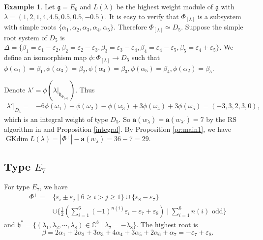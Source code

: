 \documentclass[reqno,12pt]{amsart}
\numberwithin{equation}{section}
\theoremstyle{plain}
\theoremstyle{definition}
\newtheorem{ex}[Thm]{Example}
\newcommand{\lam}{\lambda}
\newcommand{\ep}{\varepsilon}
\newcommand{\Ann}{\mathrm{Ann}}
\newcommand{\hs}{ \mathfrak{h}^*}
\newcommand{\aff}{ \mathbf{a} }
\newcommand{\gkd}{\operatorname{GKdim}}
\renewcommand{\leq}{\leqslant}
\renewcommand{\geq}{\geqslant}
\begin{document}
\begin{ex}
	Let $\mathfrak{g}=E_6$ and $L(\lam)$ be the highest weight module of $\mathfrak{g}$ with  $\lambda=(1,2,1,4,4.5,0.5, 0.5, -0.5)$. It is easy to verify that $\Phi_{[\lambda]}$ is a subsystem with simple roots $\{ \alpha_1,\alpha_2,\alpha_3,  \alpha_4, \alpha_5\}$. Therefore $\Phi_{[\lambda]}\simeq D_5$. Suppose the simple root system of $D_5$ is $\Delta=\{\beta_1=\ep_1-\ep_2, \beta_2=\ep_2-\ep_3, \beta_3=\ep_3-\ep_4,\beta_4=\ep_4-\ep_5,\beta_5=\ep_4+\ep_5\}$. We define an isomorphism map $\phi: \Phi_{[\lambda]} \rightarrow D_5$  such that  $\phi(\alpha_1)=\beta_1, \phi(\alpha_3)=\beta_2, \phi(\alpha_4)=\beta_3, \phi(\alpha_5)=\beta_4,\phi(\alpha_2)=\beta_5$.

Denote ${\lam}'=\phi(\lam|_{\mathfrak{h}_{\Phi_{[\lambda]}}})$. 
Thus 
 \begin{align*}
     \lam'|_{D_5}=& -6\phi(\omega_1)+\phi(\omega_2)-\phi(\omega_3)+3\phi(\omega_4)+3\phi(\omega_5)=(-3,3,2,3,0),
 \end{align*}
which is an integral weight of type $D_5$.
 So $\aff(w_{\lambda})=\aff(w_{\lam'})=7$ by the RS algorithm in \cite{BXX} and Proposition \ref{integral}.
 By Proposition \ref{pr:main1},  we have $\gkd L(\lambda)=|\Phi^+|-\aff(w_{\lambda})=36-7=29$. 
\end{ex}


\subsection{Type \texorpdfstring{$E_7$}{}}
For type $E_7$, we have \begin{align*}
  \Phi^+=&
\{\ep_i \pm \ep_j \mid 6\geq i > j\geq 1\}\cup\{\ep_8-\ep_7\} \\
&\cup
\Big\{ \frac{1}{2}(\sum_{i=1}^6 (-1)^{n(i)}\ep_i -\ep_7+\ep_8)\mid \sum_{i=1}^6n(i) \text{ odd} \Big\}  
\end{align*}
and $ \hs=\{ (\lam_1,\lam_2,\cdots,\lam_8)\in\mathbb{C}^8\mid \lam_7=-\lam_8\} $. The highest root is $$\beta=2\alpha_1+2\alpha_2+3\alpha_3+4\alpha_4+3\alpha_5+2\alpha_6+\alpha_7=-\ep_7+\ep_8.$$
\end{document}
